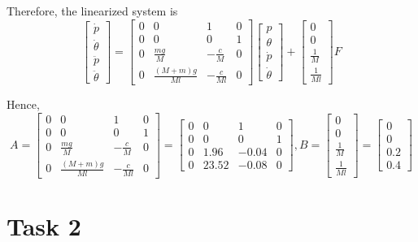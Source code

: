 \documentclass[12pt]{article}
\begin{document}
Therefore, the linearized system is
$$\begin{bmatrix}
    \dot{p} \\ \dot{\theta} \\ \ddot{p} \\ \ddot{\theta}
\end{bmatrix} = \begin{bmatrix}
    0 & 0 & 1 & 0 \\
    0 & 0 & 0 & 1 \\
    0 & \frac{mg}{M} & -\frac{c}{M} & 0 \\
    0 & \frac{(M+m)g}{Ml} & -\frac{c}{Ml} & 0
\end{bmatrix}\begin{bmatrix}
    p \\ \theta \\ \dot{p} \\ \dot{\theta}
\end{bmatrix} + \begin{bmatrix}
    0 \\ 0 \\ \frac{1}{M} \\ \frac{1}{Ml}
\end{bmatrix}F$$

Hence,
$$A = \begin{bmatrix}
    0 & 0 & 1 & 0 \\
    0 & 0 & 0 & 1 \\
    0 & \frac{mg}{M} & -\frac{c}{M} & 0 \\
    0 & \frac{(M+m)g}{Ml} & -\frac{c}{Ml} & 0
\end{bmatrix} = \begin{bmatrix}
    0 & 0 & 1 & 0 \\
    0 & 0 & 0 & 1 \\
    0 & 1.96 & -0.04 & 0 \\
    0 & 23.52 & -0.08 & 0
\end{bmatrix}, B = \begin{bmatrix}
    0 \\ 0 \\ \frac{1}{M} \\ \frac{1}{Ml}
\end{bmatrix} = \begin{bmatrix}
    0 \\ 0 \\ 0.2 \\ 0.4
\end{bmatrix}$$

\section{Task 2}
\end{document}
